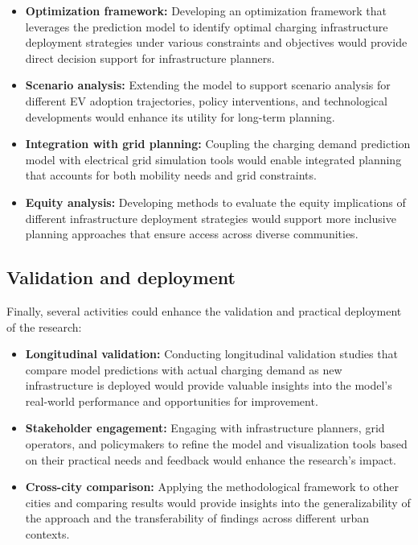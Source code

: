 \begin{itemize}
    \item \textbf{Optimization framework:} Developing an optimization framework that leverages the prediction model to identify optimal charging infrastructure deployment strategies under various constraints and objectives would provide direct decision support for infrastructure planners.

    \item \textbf{Scenario analysis:} Extending the model to support scenario analysis for different EV adoption trajectories, policy interventions, and technological developments would enhance its utility for long-term planning.

    \item \textbf{Integration with grid planning:} Coupling the charging demand prediction model with electrical grid simulation tools would enable integrated planning that accounts for both mobility needs and grid constraints.

    \item \textbf{Equity analysis:} Developing methods to evaluate the equity implications of different infrastructure deployment strategies would support more inclusive planning approaches that ensure access across diverse communities.
\end{itemize}

\subsection{Validation and deployment}

Finally, several activities could enhance the validation and practical deployment of the research:

\begin{itemize}
    \item \textbf{Longitudinal validation:} Conducting longitudinal validation studies that compare model predictions with actual charging demand as new infrastructure is deployed would provide valuable insights into the model's real-world performance and opportunities for improvement.

    \item \textbf{Stakeholder engagement:} Engaging with infrastructure planners, grid operators, and policymakers to refine the model and visualization tools based on their practical needs and feedback would enhance the research's impact.

    \item \textbf{Cross-city comparison:} Applying the methodological framework to other cities and comparing results would provide insights into the generalizability of the approach and the transferability of findings across different urban contexts.
\end{itemize}


